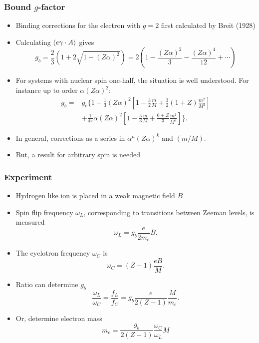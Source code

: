 \documentclass[11ppt]{beamer}
\newcommand{\beq}{\begin{equation*} }
\newcommand{\eeq}{\end{equation*} }
\begin{document}
\begin{frame}
\frametitle{Bound $g$-factor}
\begin{itemize}
  \item Binding corrections for the electron with $g=2$ first calculated by Breit (1928)
  \item Calculating $\left<  e\gamma \cdot A \right>$ gives
  		\beq 
			g_b =  \frac{2}{3}\left( 1 + 2 \sqrt{1 - (Z\alpha)^2}\right)  = 2 \left( 1 - \frac{(Z\alpha)^2}{3} - \frac{(Z\alpha)^4}{12}  + \cdots \right )
		\eeq	
  \item	For systems with nuclear spin one-half, the situation is well understood.  For instance up to order $\alpha (Z\alpha)^2$:
		\footnotesize \beq \begin{split}
	g_b = &g_e \Big \{ 1 - \frac{1}{3} (Z\alpha)^2 \left[ 1 - \frac{3}{2} \frac{m}{M} + \frac{3}{2}(1+Z) \frac{m^2}{M^2} \right ]
		\\& + \frac{1}{4\pi} \alpha (Z\alpha)^2 \left[ 1 - \frac{5}{3} \frac{m}{M} + \frac{6+Z}{3} \frac{m^2}{M^2} \right ] \Big \}.
		\end{split}
\eeq \normalsize
	\item In general, corrections as a series in $\alpha^n (Z\alpha)^k$ and $(m/M)$.
	\item But, a result for arbitrary spin is needed 
\end{itemize}
  
\end{frame}


\begin{frame}
\frametitle{Experiment}
 


\begin{itemize}
  \item	Hydrogen like ion is placed in a weak magnetic field $B$
  \item Spin flip frequency $\omega_L$, corresponding to transitions between Zeeman levels, is measured
   	\beq
		\omega_L = g_b \frac{e}{2m_e} B.
	\eeq
  \item The cyclotron frequency $\omega_C$ is
	\beq
		\omega_C = (Z-1) \frac{eB}{M}.
	\eeq
	\item Ratio can determine $g_b$
	\beq
		\frac{\omega_L}{\omega_C} = \frac{f_L}{f_C} = 
		g_b \frac{e}{2(Z-1)} \frac{M}{m_e}.
	\eeq	
	\item Or, determine electron mass
		\beq
			m_e = \frac{g_b}{2(Z-1)} \frac{\omega_C}{\omega_L} M
		\eeq
\end{itemize}
\end{frame}
\end{document}
